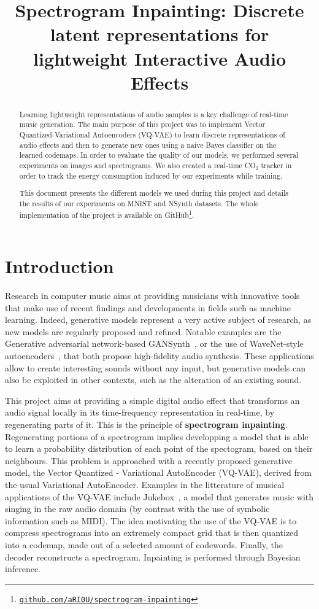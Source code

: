 \documentclass{article}
\title{Spectrogram Inpainting: Discrete latent representations for lightweight Interactive Audio Effects}
\begin{document}
%
\maketitle
%
\begin{abstract}%
Learning lightweight representations of audio samples is a key challenge of real-time music generation.
The main purpose of this project was to implement Vector Quantized-Variational Autoencoders (VQ-VAE) to learn discrete representations of audio effects and then to generate new ones using a naive Bayes classifier on the learned codemaps.
In order to evaluate the quality of our models, we performed several experiments on images and spectrograms.
We also created a real-time CO$_2$ tracker in order to track the energy consumption induced by our experiments while training.

This document presents the different models we used during this project and details the results of our experiments on MNIST and NSynth datasets.
The whole implementation of the project is available on GitHub\footnote{\href{https://github.com/aRI0U/spectrogram-inpainting}{\tt github.com/aRI0U/spectrogram-inpainting}}.
\end{abstract}
%
\section{Introduction}\label{sec:introduction}

Research in computer music aims at providing musicians with innovative tools that make use of recent findings and developments in fields such as machine learning. Indeed, generative models represent a very active subject of research, as new models are regularly proposed and refined. Notable examples are the Generative adversarial network-based GANSynth~\cite{GANSynth}, or the use of WaveNet-style autoencoders~\cite{NSynth, WavenetSpeech}, that both propose high-fidelity audio synthesis. These applications allow to create interesting sounds without any input, but generative models can also be exploited in other contexts, such as the alteration of an existing sound.

This project aims at providing a simple digital audio effect that transforms an audio signal locally in its time-frequency representation in real-time, by regenerating parts of it. This is the principle of \textbf{spectrogram inpainting}. Regenerating portions of a spectrogram implies developping a model that is able to learn a probability distribution of each point of the spectogram, based on their neighbours. This problem is approached with a recently proposed generative model, the Vector Quantized - Variational AutoEncoder (VQ-VAE), derived from the usual Variational AutoEncoder. Examples in the litterature of musical applications of the VQ-VAE include Jukebox~\cite{Jukebox}, a model that generates music with singing in the raw audio domain (by contrast with the use of symbolic information such as MIDI). The idea motivating the use of the VQ-VAE is to compress spectrograms into an extremely compact grid that is then quantized into a codemap, made out of a selected amount of codewords. Finally, the decoder reconstructs a spectrogram. Inpainting is performed through Bayesian inference.\\
\end{document}
